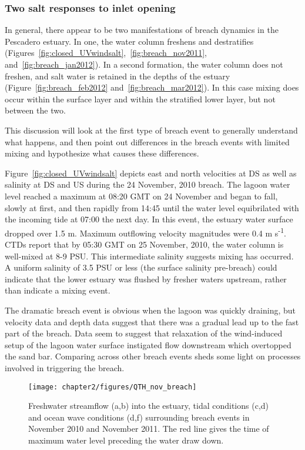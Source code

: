 \subsubsection{Two salt responses to inlet opening}
In general, there appear to be two manifestations of breach dynamics in the Pescadero estuary.  In one, the water column freshens and destratifies (Figures~\ref{fig:closed_UVwindsalt},~\ref{fig:breach_nov2011}, and~\ref{fig:breach_jan2012}). In a second formation, the water column does not freshen, and salt water is retained in the depths of the estuary (Figure~\ref{fig:breach_feb2012} and~\ref{fig:breach_mar2012}). In this case mixing does occur within the surface layer and within the stratified lower layer, but not between the two.

This discussion will look at the first type of breach event to generally understand what happens, and then point out differences in the breach events with limited mixing and hypothesize what causes these differences. 

Figure~\ref{fig:closed_UVwindsalt} depicts east and north velocities at DS as well as salinity at DS and US during the 24 November, 2010 breach. The lagoon water level reached a maximum at 08:20 GMT on 24 November and began to fall, slowly at first, and then rapidly from 14:45 until the water level equibrilated with the incoming tide at 07:00 the next day. In this event, the estuary water surface dropped over 1.5 m. Maximum outflowing velocity magnitudes were 0.4 m s\textsuperscript{-1}. CTDs report that by 05:30 GMT on 25 November, 2010, the water column is well-mixed at 8-9 PSU. This intermediate salinity suggests mixing has occurred. A uniform salinity of 3.5 PSU or less (the surface salinity pre-breach) could indicate that the lower estuary was flushed by fresher waters upstream, rather than indicate a mixing event.

The dramatic breach event is obvious when the lagoon was quickly draining, but velocity data and depth data suggest that there was a gradual lead up to the fast part of the breach. Data seem to suggest that relaxation of the wind-induced setup of the lagoon water surface instigated flow downstream which overtopped the sand bar. Comparing across other breach events sheds some light on processes involved in triggering the breach. 



\begin{figure}
	\texttt{[image: chapter2/figures/QTH\_nov\_breach]}
\caption{Freshwater streamflow (a,b) into the estuary, tidal conditions (c,d) and ocean wave conditions (d,f) surrounding breach events in November 2010 and November 2011. The red line gives the time of maximum water level preceding the water draw down.} \label{fig:QbreachNov}
\end{figure}


